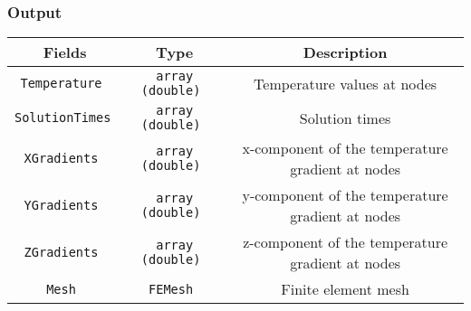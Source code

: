 \subsubsection{Output}

\renewcommand{\arraystretch}{1.5}
\begin{table}[h]
    \centering
    \begin{tabular}{|>{\customfont}c|>{\customfont}c|>{\customfont}c|}
        \hline 
        \rowcolor{gray!30}
        \textbf{Fields} & \textbf{Type} & \textbf{Description} \\ \hline
        \tt Temperature & \tt array (double) & Temperature values at nodes\\ \hline 
        \tt SolutionTimes & \tt array (double) & Solution times \\ \hline 
        \tt XGradients	& \tt array (double) & x-component of the temperature gradient at nodes\\ \hline 
        \tt YGradients & \tt array (double) & y-component of the temperature gradient at nodes\\ \hline 
        \tt ZGradients & \tt array (double) & z-component of the temperature gradient at nodes \\ \hline 
        \tt Mesh & \tt FEMesh & Finite element mesh \\ \hline
    \end{tabular}
\end{table}
\ 

